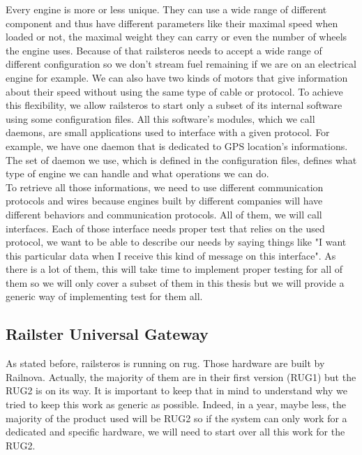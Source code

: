 \documentclass[12pt]{article}
\theoremstyle{definition}
\theoremstyle{definition}
\theoremstyle{remark}
\begin{document}
Every engine is more or less unique. They can use a wide range of different component and thus have different parameters like their maximal speed when loaded or not, the maximal weight they can carry or even the number of wheels the engine uses. Because of that \gls{railsteros} needs to accept a wide range of different configuration so we don't stream fuel remaining if we are on an electrical engine for example. We can also have two kinds of motors that give information about their speed without using the same type of cable or protocol. To achieve this flexibility, we allow \gls{railsteros} to start only a subset of its internal software using some configuration files. All this software's modules, which we call \gls{daemons}, are small applications used to interface with a given protocol. For example, we have one daemon that is dedicated to GPS location's informations. The set of daemon we use, which is defined in the configuration files, defines what type of engine we can handle and what operations we can do.\\

To retrieve all those informations, we need to use different communication protocols and wires because engines built by different companies will have different behaviors and communication protocols. All of them, we will call interfaces. Each of those interface needs proper test that relies on the used protocol, we want to be able to describe our needs by saying things like "I want this particular data when I receive this kind of message on this interface". As there is a lot of them, this will take time to implement proper testing for all of them so we will only cover a subset of them in this thesis but we will provide a generic way of implementing test for them all.


\subsection{Railster Universal Gateway}

As stated before, \gls{railsteros} is running on \gls{rug}. Those hardware are built by Railnova. Actually, the majority of them are in their first version (RUG1) but the RUG2 is on its way. It is important to keep that in mind to understand why we tried to keep this work as generic as possible. Indeed, in a year, maybe less, the majority of the product used will be RUG2 so if the system can only work for a dedicated and specific hardware, we will need to start over all this work for the RUG2.\\
\end{document}
